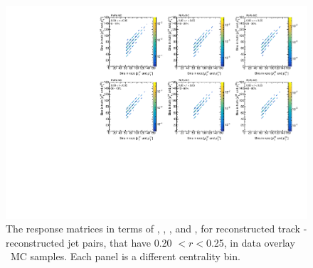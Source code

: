 \begin{figure}[ht]
\centering
\includegraphics[page=5, width=1.0\textwidth]{figures_corrections/resp_matrix_ChPS_PbPb_MC.pdf}
\caption{The response matrices in terms of \ptjetreco, \ptjettruth, \pttrkreco, and \pttrktruth, for reconstructed track - reconstructed jet pairs, that have 0.20 $< r < $0.25, in data overlay \pbpb\ MC samples. Each panel is a different centrality bin.}
\label{fig:PbPb_ChPS_respmatrix}
\end{figure}

